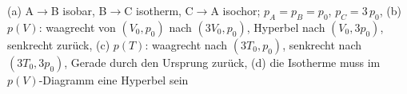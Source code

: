 (a) A$\to$B isobar, B$\to$C isotherm, C$\to$A isochor; $p_A = p_B = p_0$, $p_C = 3\,p_0$, (b) $p(V)$: waagrecht von $(V_0, p_0)$ nach $(3V_0, p_0)$, Hyperbel nach $(V_0, 3p_0)$, senkrecht zurück, (c) $p(T)$: waagrecht nach $(3T_0, p_0)$, senkrecht nach $(3T_0, 3p_0)$, Gerade durch den Ursprung zurück, (d) die Isotherme muss im $p(V)$-Diagramm eine Hyperbel sein
